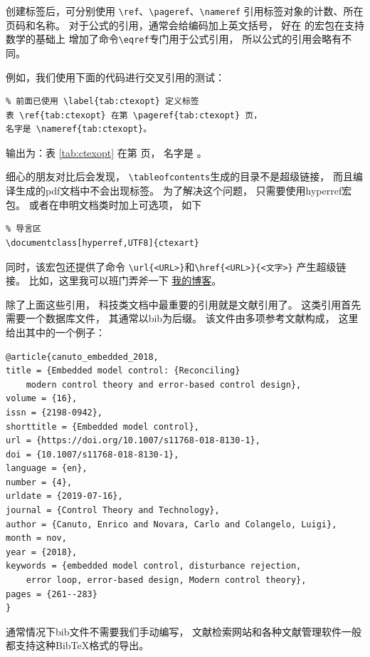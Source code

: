 \documentclass{ctexart}
\numberwithin{equation}{section}			%
\begin{document}
	创建标签后，可分别使用
	\verb|\ref|、\verb|\pageref|、\verb|\nameref|
	引用标签对象的计数、所在页码和名称。
	对于公式的引用，通常会给编码加上英文括号，
	好在 \AmS 的宏包在支持数学的基础上
	增加了命令\verb|\eqref|专门用于公式引用，
	所以公式的引用会略有不同。
	
	例如，我们使用下面的代码进行交叉引用的测试：

\begin{lstlisting}
% 前面已使用 \label{tab:ctexopt} 定义标签
表 \ref{tab:ctexopt} 在第 \pageref{tab:ctexopt} 页，
名字是 \nameref{tab:ctexopt}。
\end{lstlisting}
	
	输出为：表 \ref{tab:ctexopt} 在第 \pageref{tab:ctexopt} 页，
	名字是 。
	
	细心的朋友对比后会发现，
	\verb|\tableofcontents|生成的目录不是超级链接，
	而且编译生成的pdf文档中不会出现标签。
	为了解决这个问题，
	只需要使用hyperref宏包。
	或者在申明文档类时加上可选项，
	如下
	
\begin{lstlisting}
% 导言区
\documentclass[hyperref,UTF8]{ctexart}
\end{lstlisting}
	
	同时，该宏包还提供了命令
	\verb|\url{<URL>}|和\verb|\href{<URL>}{<文字>}|
	产生超级链接。
	比如，这里我可以班门弄斧一下
	\href{https://ichunyu.github.io}{我的博客}。
	
	除了上面这些引用，
	科技类文档中最重要的引用就是文献引用了。
	这类引用首先需要一个数据库文件，
	其通常以bib为后缀。
	该文件由多项参考文献构成，
	这里给出其中的一个例子：
	
\begin{lstlisting}
@article{canuto_embedded_2018,
title = {Embedded model control: {Reconciling} 
	modern control theory and error-based control design},
volume = {16},
issn = {2198-0942},
shorttitle = {Embedded model control},
url = {https://doi.org/10.1007/s11768-018-8130-1},
doi = {10.1007/s11768-018-8130-1},
language = {en},
number = {4},
urldate = {2019-07-16},
journal = {Control Theory and Technology},
author = {Canuto, Enrico and Novara, Carlo and Colangelo, Luigi},
month = nov,
year = {2018},
keywords = {embedded model control, disturbance rejection,
	error loop, error-based design, Modern control theory},
pages = {261--283}
}
\end{lstlisting}
	
	通常情况下bib文件不需要我们手动编写，
	文献检索网站和各种文献管理软件一般都支持这种BibTeX格式的导出。
	
\end{document}
